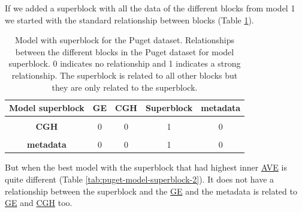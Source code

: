 \documentclass[
  12pt,
  a4paper,
  twoside,
  openright]{book}
\begin{document}
If we added a superblock with all the data of the different blocks from model 1 we started with the standard relationship between blocks (Table \ref{tab:puget-model-superblock}).

\begin{table}[H]

\caption[Model with superblock for the Puget dataset.]{\label{tab:puget-model-superblock}Model with superblock for the Puget dataset. Relationships between the different blocks in the Puget dataset for model superblock. 0 indicates no relationship and 1 indicates a strong relationship. The superblock is related to all other blocks but they are only related to the superblock.}
\centering
\begin{tabular}[t]{>{}c|c|c|c|c}
\hline
\textbf{Model superblock} & \textbf{GE} & \textbf{CGH} & \textbf{Superblock} & \textbf{metadata}\\
\hline
\textbf{\cellcolor{gray!6}{GE}} & \cellcolor{gray!6}{0} & \cellcolor{gray!6}{0} & \cellcolor{gray!6}{1} & \cellcolor{gray!6}{0}\\
\hline
\textbf{CGH} & 0 & 0 & 1 & 0\\
\hline
\textbf{\cellcolor{gray!6}{Superblock}} & \cellcolor{gray!6}{1} & \cellcolor{gray!6}{1} & \cellcolor{gray!6}{0} & \cellcolor{gray!6}{1}\\
\hline
\textbf{metadata} & 0 & 0 & 1 & 0\\
\hline
\end{tabular}
\end{table}

But when the best model with the superblock that had highest inner \protect\hyperlink{acronyms_AVE}{AVE} is quite different (Table \ref{tab:puget-model-superblock-2}).
It does not have a relationship between the superblock and the \protect\hyperlink{acronyms_GE}{GE} and the metadata is related to \protect\hyperlink{acronyms_GE}{GE} and \protect\hyperlink{acronyms_CGH}{CGH} too.
\end{document}
